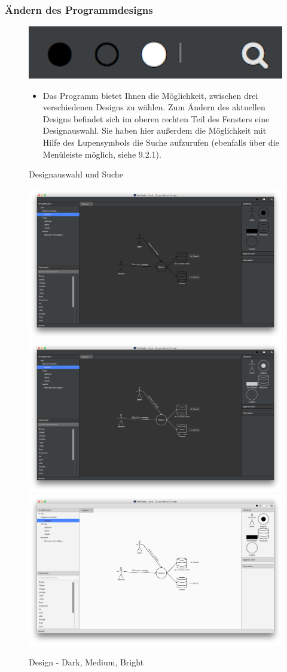 \subsubsection{Ändern des Programmdesigns}
\begin{figure}[h!]
	\centering
	\includegraphics[width=.4\textwidth]{Design_Aendern.png}
	\caption{Designauswahl und Suche}
\begin{itemize}	
\item Das Programm bietet Ihnen die Möglichkeit, zwischen drei verschiedenen Designs zu wählen. Zum Ändern des aktuellen Designs befindet sich im oberen rechten Teil des Fensters eine Designauswahl. Sie haben hier außerdem die Möglichkeit mit Hilfe des Lupensymbols die Suche aufzurufen (ebenfalls über die Menüleiste möglich, siehe 9.2.1).
\end{itemize}
\end{figure}

\begin{figure}[h!]
	\centering
	\includegraphics[width=.45\textwidth]{Design_Dark.png}
	\includegraphics[width=.45\textwidth]{Design_Medium.png}
	\includegraphics[width=.45\textwidth]{Design_Bright.png}
	\caption{Design - Dark, Medium, Bright}

\end{figure}